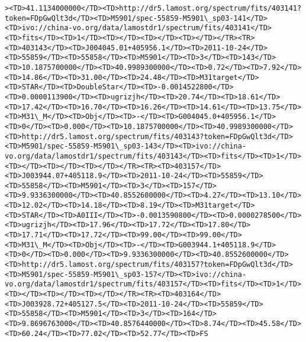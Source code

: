\documentclass[11pt]{article}
\begin{document}
\begin{Verbatim}[commandchars=\\\{\}]
><TD>41.1134000000</TD><TD>http://dr5.lamost.org/spectrum/fits/403141?token=FDpGwQlt3d</TD><TD>M5901/spec-55859-M5901\_sp03-141</TD><TD>ivo://china-vo.org/data/lamostdr1/spectrum/fits/403141</TD><TD>fits</TD><TD>1</TD><TD></TD><TD></TD><TD></TD></TR><TR><TD>403143</TD><TD>J004045.01+405956.1</TD><TD>2011-10-24</TD><TD>55859</TD><TD>55858</TD><TD>M5901</TD><TD>3</TD><TD>143</TD><TD>10.1875700000</TD><TD>40.9989300000</TD><TD>0.72</TD><TD>7.92</TD><TD>14.86</TD><TD>31.00</TD><TD>24.48</TD><TD>M31target</TD><TD>STAR</TD><TD>DoubleStar</TD><TD>-0.0014522800</TD><TD>0.0000113900</TD><TD>ugrizjh</TD><TD>20.74</TD><TD>18.61</TD><TD>17.42</TD><TD>16.70</TD><TD>16.26</TD><TD>14.61</TD><TD>13.75</TD><TD>M31\_M</TD><TD>Obj</TD><TD>-</TD><TD>G004045.0+405956.1</TD><TD>0</TD><TD>0.000</TD><TD>10.1875700000</TD><TD>40.9989300000</TD><TD>http://dr5.lamost.org/spectrum/fits/403143?token=FDpGwQlt3d</TD><TD>M5901/spec-55859-M5901\_sp03-143</TD><TD>ivo://china-vo.org/data/lamostdr1/spectrum/fits/403143</TD><TD>fits</TD><TD>1</TD><TD></TD><TD></TD><TD></TD></TR><TR><TD>403157</TD><TD>J003944.07+405118.9</TD><TD>2011-10-24</TD><TD>55859</TD><TD>55858</TD><TD>M5901</TD><TD>3</TD><TD>157</TD><TD>9.9336300000</TD><TD>40.8552600000</TD><TD>4.27</TD><TD>13.10</TD><TD>12.02</TD><TD>14.18</TD><TD>8.19</TD><TD>M31target</TD><TD>STAR</TD><TD>A0III</TD><TD>-0.0013590800</TD><TD>0.0000278500</TD><TD>ugrizjh</TD><TD>17.96</TD><TD>17.72</TD><TD>17.80</TD><TD>17.71</TD><TD>17.72</TD><TD>99.00</TD><TD>99.00</TD><TD>M31\_M</TD><TD>Obj</TD><TD>-</TD><TD>G003944.1+405118.9</TD><TD>0</TD><TD>0.000</TD><TD>9.9336300000</TD><TD>40.8552600000</TD><TD>http://dr5.lamost.org/spectrum/fits/403157?token=FDpGwQlt3d</TD><TD>M5901/spec-55859-M5901\_sp03-157</TD><TD>ivo://china-vo.org/data/lamostdr1/spectrum/fits/403157</TD><TD>fits</TD><TD>1</TD><TD></TD><TD></TD><TD></TD></TR><TR><TD>403164</TD><TD>J003928.72+405127.5</TD><TD>2011-10-24</TD><TD>55859</TD><TD>55858</TD><TD>M5901</TD><TD>3</TD><TD>164</TD><TD>9.8696763000</TD><TD>40.8576440000</TD><TD>8.74</TD><TD>45.58</TD><TD>60.24</TD><TD>77.02</TD><TD>52.77</TD><TD>FS       
\end{Verbatim}
\end{document}
